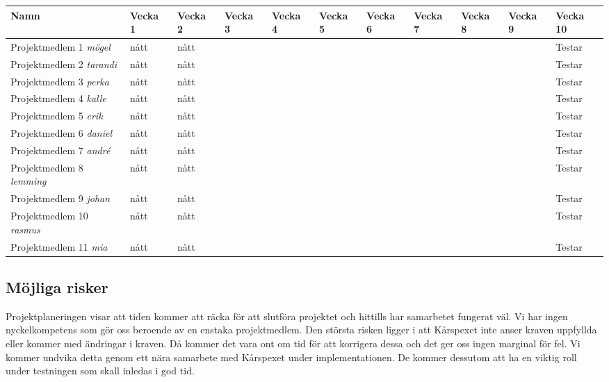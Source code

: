 \documentclass[a4paper, twoside, 11pt, titlepage]{article}
\begin{document}
	\begin {table} [ht] \begin{tabular} {  p{4cm} p{2cm} p{2cm} p{2cm} p{2cm} p{2cm} p{2cm} p{2cm} p{2cm} p{2cm} p{2cm} }
		\hline
		 Namn  &  Vecka 1 &  Vecka 2 &  Vecka 3 &  Vecka 4 &  Vecka 5 &  Vecka 6 &  Vecka 7 &  Vecka 8 &  Vecka 9 &  Vecka 10   \\
		\hline
		 Projektmedlem 1 \emph{mögel}  &  nått  &  nått  &  &  &  &  &  &  &  &  Testar   \\
		\hline
		 Projektmedlem 2 \emph{tarandi} &  nått  &  nått  &  &  &  &  &  &  &  &  Testar   \\
		\hline
		 Projektmedlem 3 \emph{perka} &  nått  &  nått  &  &  &  &  &  &  &  &  Testar   \\
		\hline
		 Projektmedlem 4 \emph{kalle} &  nått  &  nått  &  &  &  &  &  &  &  &  Testar   \\
		\hline
		 Projektmedlem 5 \emph{erik} &  nått  &  nått  &  &  &  &  &  &  &  &  Testar   \\
		\hline
		 Projektmedlem 6 \emph{daniel} &  nått  &  nått  &  &  &  &  &  &  &  &  Testar   \\
		\hline
		 Projektmedlem 7 \emph{andré} &  nått  &  nått  &  &  &  &  &  &  &  &  Testar   \\
		\hline
		 Projektmedlem 8 \emph{lemming} &  nått  &  nått  &  &  &  &  &  &  &  &  Testar   \\
		\hline
		 Projektmedlem 9 \emph{johan} &  nått  &  nått  &  &  &  &  &  &  &  &  Testar   \\
		\hline
		 Projektmedlem 10 \emph{rasmus} &  nått  &  nått  &  &  &  &  &  &  &  &  Testar   \\
		\hline
		 Projektmedlem 11 \emph{mia} &  nått  &  nått  &  &  &  &  &  &  &  &  Testar   \\
		\hline
	\end{tabular} \end{table} \FloatBarrier


	\subsection{Möjliga risker}


	Projektplaneringen visar att tiden kommer att räcka för att slutföra projektet och hittills har samarbetet fungerat väl. Vi har ingen nyckelkompetens som gör oss beroende av en enstaka projektmedlem. Den största risken ligger i att Kårspexet inte anser kraven uppfyllda eller kommer med ändringar i kraven. Då kommer det vara ont om tid för att korrigera dessa och det ger oss ingen marginal för fel. Vi kommer undvika detta genom ett nära samarbete med Kårspexet under implementationen. De kommer dessutom att ha en viktig roll under testningen som skall inledas i god tid. 
\end{document}
